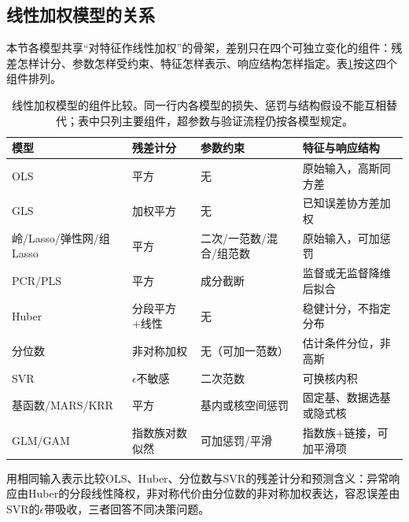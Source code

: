 \subsection{线性加权模型的关系}
\label{sec:regression-linear-relation}

本节各模型共享“对特征作线性加权”的骨架，差别只在四个可独立变化的组件：残差怎样计分、参数怎样受约束、特征怎样表示、响应结构怎样指定。表\ref{tab:regression-linear-comparison}按这四个组件排列。

\begin{table}[t]
  \centering
  \small
  \setlength{\tabcolsep}{4pt}
  \renewcommand{\arraystretch}{1.25}
  \begin{tabularx}{\linewidth}{@{}>{\RaggedRight\arraybackslash}p{22mm}>{\RaggedRight\arraybackslash}p{30mm}>{\RaggedRight\arraybackslash}p{26mm}>{\RaggedRight\arraybackslash}X@{}}
    \toprule
    模型 & 残差计分 & 参数约束 & 特征与响应结构 \\
    \midrule
    OLS & 平方 & 无 & 原始输入，高斯同方差 \\
    \addlinespace
    GLS & 加权平方 & 无 & 已知误差协方差加权 \\
    \addlinespace
    岭/Lasso/弹性网/组Lasso & 平方 & 二次/一范数/混合/组范数 & 原始输入，可加惩罚 \\
    \addlinespace
    PCR/PLS & 平方 & 成分截断 & 监督或无监督降维后拟合 \\
    \addlinespace
    Huber & 分段平方+线性 & 无 & 稳健计分，不指定分布 \\
    \addlinespace
    分位数 & 非对称加权 & 无（可加一范数） & 估计条件分位，非高斯 \\
    \addlinespace
    SVR & $\epsilon$不敏感 & 二次范数 & 可换核内积 \\
    \addlinespace
    基函数/MARS/KRR & 平方 & 基内或核空间惩罚 & 固定基、数据选基或隐式核 \\
    \addlinespace
    GLM/GAM & 指数族对数似然 & 可加惩罚/平滑 & 指数族+链接，可加平滑项 \\
    \bottomrule
  \end{tabularx}
  \caption{线性加权模型的组件比较。同一行内各模型的损失、惩罚与结构假设不能互相替代；表中只列主要组件，超参数与验证流程仍按各模型规定。}
  \label{tab:regression-linear-comparison}
\end{table}

用相同输入表示比较OLS、Huber、分位数与SVR的残差计分和预测含义：异常响应由Huber的分段线性降权，非对称代价由分位数的非对称加权表达，容忍误差由SVR的$\epsilon$带吸收，三者回答不同决策问题。

